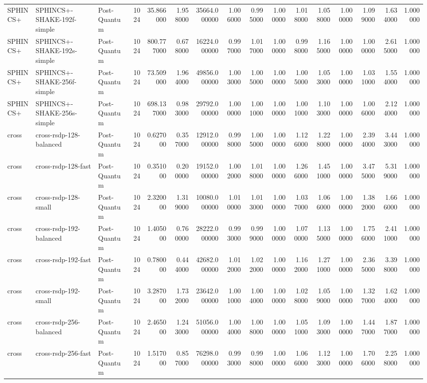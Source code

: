 \begin{table}
\begin{tabular}{lllrrrrrrrrrrrrr}
SPHINCS+ & SPHINCS+-SHAKE-192f-simple & Post-Quantum & 1024 & 35.866000 & 1.958000 & 35664.000000 & 1.006000 & 0.995000 & 1.000000 & 1.018000 & 1.058000 & 1.000000 & 1.099000 & 1.634000 & 1.000000 \\
SPHINCS+ & SPHINCS+-SHAKE-192s-simple & Post-Quantum & 1024 & 800.777000 & 0.678000 & 16224.000000 & 0.997000 & 1.017000 & 1.000000 & 0.998000 & 1.165000 & 1.000000 & 1.000000 & 2.615000 & 1.000000 \\
SPHINCS+ & SPHINCS+-SHAKE-256f-simple & Post-Quantum & 1024 & 73.509000 & 1.964000 & 49856.000000 & 1.003000 & 1.005000 & 1.000000 & 1.005000 & 1.053000 & 1.000000 & 1.031000 & 1.554000 & 1.000000 \\
SPHINCS+ & SPHINCS+-SHAKE-256s-simple & Post-Quantum & 1024 & 698.137000 & 0.983000 & 29792.000000 & 1.000000 & 1.001000 & 1.000000 & 1.001000 & 1.103000 & 1.000000 & 1.006000 & 2.124000 & 1.000000 \\
cross & cross-rsdp-128-balanced & Post-Quantum & 1024 & 0.627000 & 0.357000 & 12912.000000 & 0.998000 & 1.005000 & 1.000000 & 1.126000 & 1.228000 & 1.000000 & 2.394000 & 3.443000 & 1.000000 \\
cross & cross-rsdp-128-fast & Post-Quantum & 1024 & 0.351000 & 0.200000 & 19152.000000 & 1.002000 & 1.018000 & 1.000000 & 1.266000 & 1.451000 & 1.000000 & 3.475000 & 5.319000 & 1.000000 \\
cross & cross-rsdp-128-small & Post-Quantum & 1024 & 2.320000 & 1.319000 & 10080.000000 & 1.010000 & 1.013000 & 1.000000 & 1.037000 & 1.066000 & 1.000000 & 1.382000 & 1.666000 & 1.000000 \\
cross & cross-rsdp-192-balanced & Post-Quantum & 1024 & 1.405000 & 0.760000 & 28222.000000 & 0.993000 & 0.999000 & 1.000000 & 1.070000 & 1.135000 & 1.000000 & 1.756000 & 2.411000 & 1.000000 \\
cross & cross-rsdp-192-fast & Post-Quantum & 1024 & 0.780000 & 0.444000 & 42682.000000 & 1.012000 & 1.022000 & 1.000000 & 1.162000 & 1.271000 & 1.000000 & 2.365000 & 3.398000 & 1.000000 \\
cross & cross-rsdp-192-small & Post-Quantum & 1024 & 3.287000 & 1.732000 & 23642.000000 & 1.001000 & 1.004000 & 1.000000 & 1.028000 & 1.059000 & 1.000000 & 1.327000 & 1.624000 & 1.000000 \\
cross & cross-rsdp-256-balanced & Post-Quantum & 1024 & 2.465000 & 1.243000 & 51056.000000 & 1.004000 & 1.008000 & 1.000000 & 1.051000 & 1.093000 & 1.000000 & 1.447000 & 1.877000 & 1.000000 \\
cross & cross-rsdp-256-fast & Post-Quantum & 1024 & 1.517000 & 0.857000 & 76298.000000 & 0.993000 & 0.998000 & 1.000000 & 1.066000 & 1.123000 & 1.000000 & 1.706000 & 2.258000 & 1.000000 \\

\end{tabular}
\end{table}

